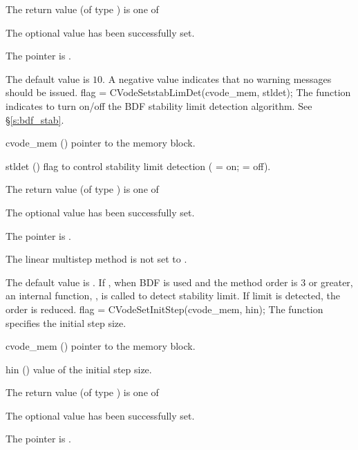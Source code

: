 {
  The return value  (of type ) is one of
  \begin{args}
  \item[\Id{CV\_SUCCESS}] 
    The optional value has been successfully set.
  \item[\Id{CV\_MEM\_NULL}]
    The  pointer is .
  \end{args}
}
{
  The default value is $10$.
  A negative  value indicates that no warning messages should
  be issued.
}
{
flag = CVodeSetstabLimDet(cvode\_mem, stldet);
}
{
  The function  indicates to turn on/off
  the BDF stability limit detection algorithm. See \S\ref{s:bdf_stab}.
}
{
  \begin{args}
  \item[cvode\_mem] ()
    pointer to the {\cvode} memory block.
  \item[stldet] ()
    flag to control stability limit detection ( = on;  = off).
  \end{args}
}
{
  The return value  (of type ) is one of
  \begin{args}
  \item[\Id{CV\_SUCCESS}] 
    The optional value has been successfully set.
  \item[\Id{CV\_MEM\_NULL}]
    The  pointer is .
  \item[\Id{CV\_ILL\_INPUT}]
    The linear multistep method is not set to .
  \end{args}
}
{
  The default value is . If , when BDF is used
  and the method order is 3 or greater, an internal function, ,
  is called to detect stability limit. If limit is detected, the order is reduced.
}
{
flag = CVodeSetInitStep(cvode\_mem, hin);
}
{
  The function  specifies the initial step size.
}
{
  \begin{args}
  \item[cvode\_mem] ()
    pointer to the {\cvode} memory block.
  \item[hin] ()
    value of the initial step size.
  \end{args}
}
{
  The return value  (of type ) is one of
  \begin{args}
  \item[\Id{CV\_SUCCESS}] 
    The optional value has been successfully set.
  \item[\Id{CV\_MEM\_NULL}]
    The  pointer is .
  \end{args}
}

